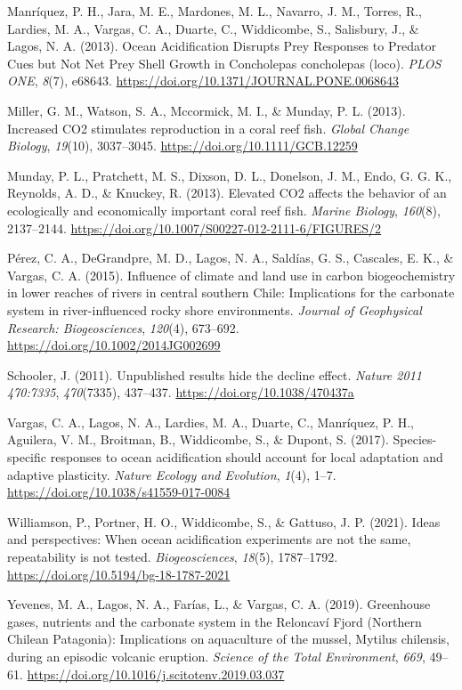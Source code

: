 \documentclass[
]{article}
\newlength{\cslhangindent}
\newenvironment{cslreferences}%
  {\setlength{\parindent}{0pt}%
  \everypar{\setlength{\hangindent}{\cslhangindent}}\ignorespaces}%
  {\par}
\begin{document}
\begin{cslreferences}
\leavevmode\hypertarget{ref-Manriquez2013}{}%
Manríquez, P. H., Jara, M. E., Mardones, M. L., Navarro, J. M., Torres,
R., Lardies, M. A., Vargas, C. A., Duarte, C., Widdicombe, S.,
Salisbury, J., \& Lagos, N. A. (2013). Ocean Acidification Disrupts Prey
Responses to Predator Cues but Not Net Prey Shell Growth in Concholepas
concholepas (loco). \emph{PLOS ONE}, \emph{8}(7), e68643.
\url{https://doi.org/10.1371/JOURNAL.PONE.0068643}

\leavevmode\hypertarget{ref-Miller2013}{}%
Miller, G. M., Watson, S. A., Mccormick, M. I., \& Munday, P. L. (2013).
Increased CO2 stimulates reproduction in a coral reef fish. \emph{Global
Change Biology}, \emph{19}(10), 3037--3045.
\url{https://doi.org/10.1111/GCB.12259}

\leavevmode\hypertarget{ref-Munday2013}{}%
Munday, P. L., Pratchett, M. S., Dixson, D. L., Donelson, J. M., Endo,
G. G. K., Reynolds, A. D., \& Knuckey, R. (2013). Elevated CO2 affects
the behavior of an ecologically and economically important coral reef
fish. \emph{Marine Biology}, \emph{160}(8), 2137--2144.
\url{https://doi.org/10.1007/S00227-012-2111-6/FIGURES/2}

\leavevmode\hypertarget{ref-Perez2015}{}%
Pérez, C. A., DeGrandpre, M. D., Lagos, N. A., Saldías, G. S., Cascales,
E. K., \& Vargas, C. A. (2015). Influence of climate and land use in
carbon biogeochemistry in lower reaches of rivers in central southern
Chile: Implications for the carbonate system in river-influenced rocky
shore environments. \emph{Journal of Geophysical Research:
Biogeosciences}, \emph{120}(4), 673--692.
\url{https://doi.org/10.1002/2014JG002699}

\leavevmode\hypertarget{ref-Schooler2011a}{}%
Schooler, J. (2011). Unpublished results hide the decline effect.
\emph{Nature 2011 470:7335}, \emph{470}(7335), 437--437.
\url{https://doi.org/10.1038/470437a}

\leavevmode\hypertarget{ref-Vargas2017}{}%
Vargas, C. A., Lagos, N. A., Lardies, M. A., Duarte, C., Manríquez, P.
H., Aguilera, V. M., Broitman, B., Widdicombe, S., \& Dupont, S. (2017).
Species-specific responses to ocean acidification should account for
local adaptation and adaptive plasticity. \emph{Nature Ecology and
Evolution}, \emph{1}(4), 1--7.
\url{https://doi.org/10.1038/s41559-017-0084}

\leavevmode\hypertarget{ref-Williamson2021}{}%
Williamson, P., Portner, H. O., Widdicombe, S., \& Gattuso, J. P.
(2021). Ideas and perspectives: When ocean acidification experiments are
not the same, repeatability is not tested. \emph{Biogeosciences},
\emph{18}(5), 1787--1792. \url{https://doi.org/10.5194/bg-18-1787-2021}

\leavevmode\hypertarget{ref-Yevenes2019}{}%
Yevenes, M. A., Lagos, N. A., Farías, L., \& Vargas, C. A. (2019).
Greenhouse gases, nutrients and the carbonate system in the Reloncaví
Fjord (Northern Chilean Patagonia): Implications on aquaculture of the
mussel, Mytilus chilensis, during an episodic volcanic eruption.
\emph{Science of the Total Environment}, \emph{669}, 49--61.
\url{https://doi.org/10.1016/j.scitotenv.2019.03.037}
\end{cslreferences}
\end{document}
